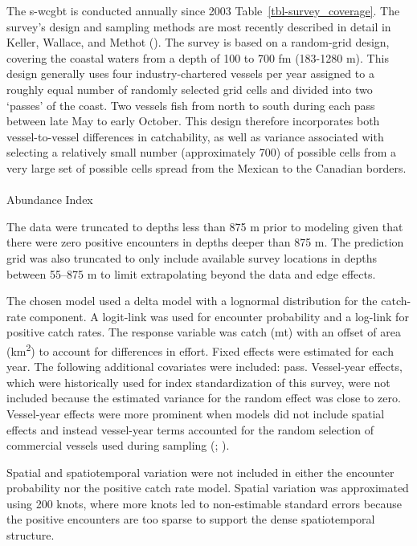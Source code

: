 \documentclass[
]{scrartcl}
\makeatletter
\let\oldparagraph\paragraph
\renewcommand{\paragraph}{
    \@ifstar
      \xxxParagraphStar
      \xxxParagraphNoStar
  }
\newcommand{\xxxParagraphStar}[1]{\oldparagraph*{#1}\mbox{}}
\newcommand{\xxxParagraphNoStar}[1]{\oldparagraph{#1}\mbox{}}
\makeatother
\begin{document}
The \gls{s-wcgbt} is conducted annually since 2003
Table~\ref{tbl-survey_coverage}. The survey's design and sampling
methods are most recently described in detail in Keller, Wallace, and
Methot (). The survey is based on a
random-grid design, covering the coastal waters from a depth of 100 to
700 fm (183-1280 m). This design generally uses four industry-chartered
vessels per year assigned to a roughly equal number of randomly selected
grid cells and divided into two `passes' of the coast. Two vessels fish
from north to south during each pass between late May to early October.
This design therefore incorporates both vessel-to-vessel differences in
catchability, as well as variance associated with selecting a relatively
small number (approximately 700) of possible cells from a very large set
of possible cells spread from the Mexican to the Canadian borders.

\paragraph{Abundance Index}\label{abundance-index}

The data were truncated to depths less than 875 m prior to modeling
given that there were zero positive encounters in depths deeper than 875
m. The prediction grid was also truncated to only include available
survey locations in depths between 55--875 m to limit extrapolating
beyond the data and edge effects.

The chosen model used a delta model with a lognormal distribution for
the catch-rate component. A logit-link was used for encounter
probability and a log-link for positive catch rates. The response
variable was catch (mt) with an offset of area (km\textsuperscript{2})
to account for differences in effort. Fixed effects were estimated for
each year. The following additional covariates were included: pass.
Vessel-year effects, which were historically used for index
standardization of this survey, were not included because the estimated
variance for the random effect was close to zero. Vessel-year effects
were more prominent when models did not include spatial effects and
instead vessel-year terms accounted for the random selection of
commercial vessels used during sampling
(;
).

Spatial and spatiotemporal variation were not included in either the
encounter probability nor the positive catch rate model. Spatial
variation was approximated using 200 knots, where more knots led to
non-estimable standard errors because the positive encounters are too
sparse to support the dense spatiotemporal structure.
\end{document}
